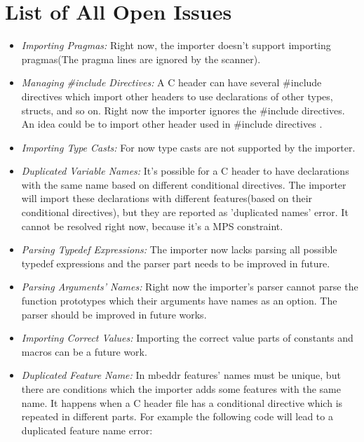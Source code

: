 \documentclass[titlepage]{article}
\begin{document}
\section{List of All Open Issues}
\begin{itemize}

\item \emph{Importing Pragmas:} Right now, the importer doesn't support importing pragmas(The pragma lines are ignored by the scanner).

\item \emph{Managing \#include Directives:} A C header can have several \#include directives which import other headers to use declarations of other types, structs, and so on. Right now the importer ignores the \#include directives. An idea could be to import other header used in \#include directives .

\item \emph{Importing Type Casts:} For now type casts are not supported by the importer.

\item \emph{Duplicated Variable Names:} It's possible for a C header to have declarations with the same name based on different conditional directives. The importer will import these declarations with different features(based on their conditional directives), but they are reported as 'duplicated names' error. It cannot be resolved right now, because it's a MPS constraint.

\item \emph{Parsing Typedef Expressions:} The importer now lacks parsing all possible typedef expressions and the parser part needs to be improved in future.

\item \emph{Parsing Arguments' Names:} Right now the importer's parser cannot parse the function prototypes which their arguments have names as an option. The parser should be improved in future works.

\item \emph{Importing Correct Values:} Importing the correct value parts of constants and macros can be a future work.

\item \emph{Duplicated Feature Name:} In mbeddr features' names must be unique, but there are conditions which the importer adds some features with the same name. It happens when a C header file has a conditional directive which is repeated in different parts. For example the following code will lead to a duplicated feature name error:


\end{itemize}
\end{document}
